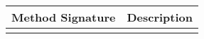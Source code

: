 
\noindent
\begin{tabularx}{\textwidth}{| l | X |}
  \hline
  \bf{Method Signature} & \bf{Description} \\
  \hline
  \lst{} &
      \\
  \hline
\end{tabularx}
     